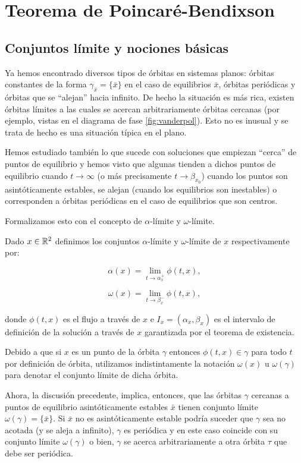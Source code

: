 \chapter{Teorema de Poincaré-Bendixson} \label{cap:poincarebendixson}

\section{Conjuntos límite y nociones básicas}

Ya hemos encontrado diversos tipos de órbitas en sistemas planos: órbitas constantes de la forma $\gamma_{\bar{x}} = \{\bar{x}\}$ en el caso de equilibrios $\bar{x}$, órbitas periódicas y órbitas que se ``alejan'' hacia infinito.
De hecho la situación es más rica, existen órbitas límites a las cuales se acercan arbitrariamente órbitas cercanas (por ejemplo, vistas en el diagrama de fase \ref{fig:vanderpol}). Esto no es inusual y se trata de hecho es una situación típica en el plano.

Hemos estudiado también lo que sucede con soluciones que empiezan ``cerca'' de puntos de equilibrio y hemos visto que algunas tienden a dichos puntos de equilibrio cuando $t \to \infty$ (o más precisamente $t \to \beta_{x_0}$) cuando los puntos son asintóticamente estables, se alejan (cuando los equilibrios son inestables) o corresponden a órbitas periódicas en el caso de equilibrios que son centros.

Formalizamos esto con el concepto de $\alpha$-límite y $\omega$-límite.

\begin{definition}Dado $x \in {\ensuremath{\mathbb{R}}}^2$ definimos los conjuntos $\alpha$-límite y $\omega$-límite de $x$ respectivamente por:

$$
	\alpha(x) = \lim_{t \to \alpha_{x}^+}{\phi(t,x)},
$$

$$
	\omega(x) = \lim_{t \to \beta_{x}^-}{\phi(t,x)},
$$

donde $\phi(t,x)$ es el flujo a través de $x$ e $I_x = (\alpha_x, \beta_x)$ es el intervalo de definición de la solución a través de $x$ garantizada por el teorema de existencia.
\end{definition}

Debido a que si $x$ es un punto de la órbita $\gamma$ entonces $\phi(t,x) \in \gamma$ para todo $t$ por definición de órbita, utilizamos indistintamente la notación $\omega(x)$ u $\omega(\gamma)$ para denotar el conjunto límite de dicha órbita.

Ahora, la discusión precedente, implica, entonces, que las órbitas $\gamma$ cercanas a puntos de equilibrio asintóticamente estables $\bar{x}$ tienen conjunto límite $\omega(\gamma) = \{\bar{x}\}$. Si $\bar{x}$ no es asintóticamente estable podría suceder que $\gamma$ sea no acotada (y se aleja a infinito), $\gamma$ es periódica y en este caso coincide con su conjunto límite $\omega(\gamma)$ o bien, $\gamma$ se acerca arbitrariamente a otra órbita $\tau$ que debe ser periódica.

